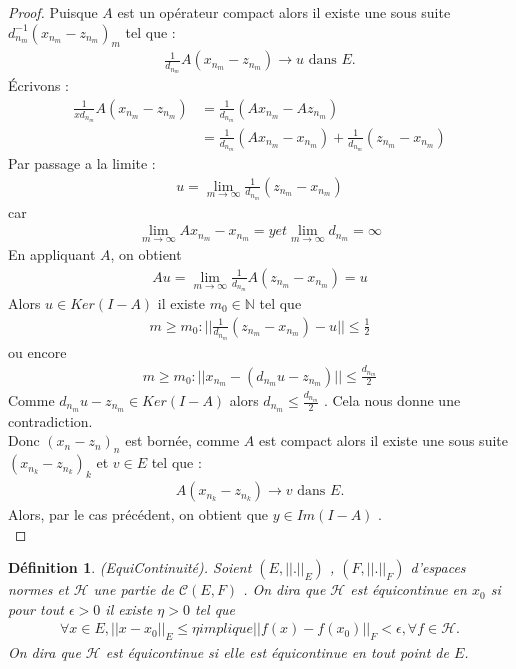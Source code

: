 \documentclass{report}
\newtheorem{Def}{Définition}[subsection]
\begin{document}
{\begin{proof}
	 Puisque $A$ est un opérateur compact alors il existe une sous suite $d_{n_m}^{-1}(x_{n_m} - z_{n_m})_m$ tel que : 
					\begin{align*}
	 				 \frac{1}{d_{n_m}} A(x_{n_m} - z_{n_m}) \rightarrow u \,\,\text{dans}\,\, E.
					\end{align*}
	 Écrivons : 
					\begin{align*}
	 				 \frac{1}{xd_{n_m}} A(x_{n_m} - z_{n_m}) &= \frac{1}{d_{n_m}} (A x_{n_m} - A z_{n_m}) \\
	 				 &= \frac{1}{d_{n_m}} (A x_{n_m} - x_{n_m}) + \frac{1}{d_{n_m}} (z_{n_m} - x_{n_m}) 
					\end{align*}
	 Par passage a la limite : 
					\begin{align*}
	 				 u = \lim_{m\to \infty} \frac{1}{d_{n_m}} (z_{n_m} - x_{n_m}) 
					\end{align*}
	 car 
					\begin{align*}
	 				 \lim_{m\to \infty} A x_{n_m} - x_{n_m} = y et \lim_{m\to \infty} d_{n_m} = \infty 
					\end{align*}
	 En appliquant $A$, on obtient 
					\begin{align*}
	 				A u = \lim_{m\to \infty} \frac{1}{d_{n_m}} A (z_{n_m} - x_{n_m}) = u
					\end{align*}
	 Alors $u \in Ker(I-A)$ il existe $m_0 \in \mathbb{N}$  tel que 
					\begin{align*}
	 				 m \ge m_0 : ||\frac{1}{d_{n_m}} (z_{n_m} - x_{n_m}) - u|| \le \frac{1}{2} 
					\end{align*}
	 ou encore 
					\begin{align*}
	 				 m \ge m_0 : ||x_{n_m} - (d_{n_m} u - z_{n_m})|| \le \frac{d_{n_m}}{2} 
					\end{align*}
	 Comme $d_{n_m} u - z_{n_m} \in Ker(I-A)$ alors $d_{n_m} \le \frac{d_{n_m}}{2}$ . Cela nous donne une contradiction. \\
	 Donc $(x_n - z_n)_n$ est bornée, comme $A$ est compact alors il existe une sous suite $(x_{n_k} - z_{n_k})_k$ et $v \in E$ tel que : 
					\begin{align*}
	 				 A(x_{n_k} - z_{n_k}) \rightarrow v \,\,\text{dans}\,\, E.
					\end{align*}
	 Alors, par le cas précédent, on obtient que $y \in Im(I-A)$ .\\
\end{proof}



\begin{Def} (EquiContinuité). Soient $(E, ||.||_E)$ , $(F,||.||_F)$ d'espaces normes et $\mathscr{H}$ une partie de $\mathscr{C}(E,F)$ . On dira que $\mathscr{H}$ est équicontinue en $x_0$ si pour tout $\epsilon > 0$ il existe $\eta > 0$ tel que 
					\begin{align*}
					 \forall x \in E , ||x-x_0||_E \le \eta implique ||f(x) - f(x_0)||_F < \epsilon , \forall f \in \mathscr{H} .
					\end{align*}
	On dira que $\mathscr{H}$ est équicontinue si elle est équicontinue en tout point de $E$.\\
\end{Def}

}
\end{document}
